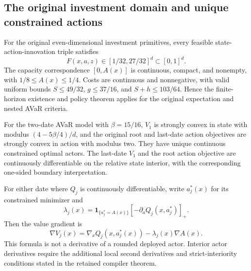\subsection{The original investment domain and unique constrained actions}
\begin{proposition}
\label{prop:investmentfoundations119}
For the original even-dimensional investment primitives, every
feasible state-action-innovation triple satisfies
\begin{equation}\label{eq:invariance119}
 F(x,a,z)\in[1/32,27/32]^d\subset[0,1]^d.
\end{equation}
The capacity correspondence $[0,A(x)]$ is continuous, compact,
and nonempty, with $1/8\le A(x)\le1/4$.  Costs are continuous
and nonnegative, with valid uniform bounds
$S\le49/32$, $g\le37/16$, and $S+h\le103/64$.
Hence the finite-horizon existence and policy theorem applies for
the original expectation and nested AVaR criteria.

For the two-date AVaR model with $\beta=15/16$, $V_1$ is strongly convex in state
with modulus $(4-5\beta/4)/d$, and the original root and last-date
action objectives are strongly convex in action with modulus two.
They have unique continuous constrained optimal actors.  The
last-date $V_1$ and the root action objective are continuously
differentiable on the relative state interior, with the corresponding
one-sided boundary interpretation.

For either date where $Q_j$ is continuously differentiable, write
$a_j^*(x)$ for its constrained minimizer and
\[
 \lambda_j(x)=\boldsymbol1_{\{a_j^*=A(x)\}}
                  [-\partial_aQ_j(x,a_j^*)]_+.
\]
Then the value gradient is
\begin{equation}\label{eq:constrainedenvelope119}
 \nabla V_j(x)=\nabla_xQ_j(x,a_j^*(x))
                         -\lambda_j(x)\nabla A(x).
\end{equation}
This formula is not a derivative of a rounded deployed actor.
Interior actor derivatives require the additional local second
derivatives and strict-interiority conditions stated in the retained
compiler theorem.
\end{proposition}

